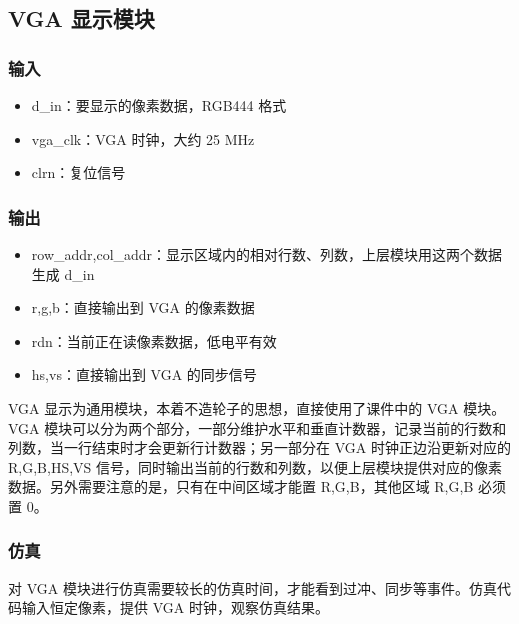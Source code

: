 \documentclass[hyperref,UTF8,12pt,a4paper]{ctexart}
\providecommand{\tightlist}{%
  \setlength{\itemsep}{0pt}\setlength{\parskip}{0pt}}
\begin{document}
\hypertarget{vga-ux663eux793aux6a21ux5757}{%
\subsection{VGA 显示模块}\label{vga-ux663eux793aux6a21ux5757}}

\hypertarget{ux8f93ux5165}{%
\subsubsection{输入}\label{ux8f93ux5165}}

\begin{itemize}
\tightlist
\item
  d\_in：要显示的像素数据，RGB444 格式
\item
  vga\_clk：VGA 时钟，大约 25 MHz
\item
  clrn：复位信号
\end{itemize}

\hypertarget{ux8f93ux51fa}{%
\subsubsection{输出}\label{ux8f93ux51fa}}

\begin{itemize}
\tightlist
\item
  row\_addr,col\_addr：显示区域内的相对行数、列数，上层模块用这两个数据生成
  d\_in
\item
  r,g,b：直接输出到 VGA 的像素数据
\item
  rdn：当前正在读像素数据，低电平有效
\item
  hs,vs：直接输出到 VGA 的同步信号
\end{itemize}

VGA 显示为通用模块，本着不造轮子的思想，直接使用了课件中的 VGA 模块。VGA
模块可以分为两个部分，一部分维护水平和垂直计数器，记录当前的行数和列数，当一行结束时才会更新行计数器；另一部分在
VGA 时钟正边沿更新对应的 R,G,B,HS,VS
信号，同时输出当前的行数和列数，以便上层模块提供对应的像素数据。另外需要注意的是，只有在中间区域才能置
R,G,B，其他区域 R,G,B 必须置 0。

\hypertarget{ux4effux771f}{%
\subsubsection{仿真}\label{ux4effux771f}}

对 VGA
模块进行仿真需要较长的仿真时间，才能看到过冲、同步等事件。仿真代码输入恒定像素，提供
VGA 时钟，观察仿真结果。
\end{document}
